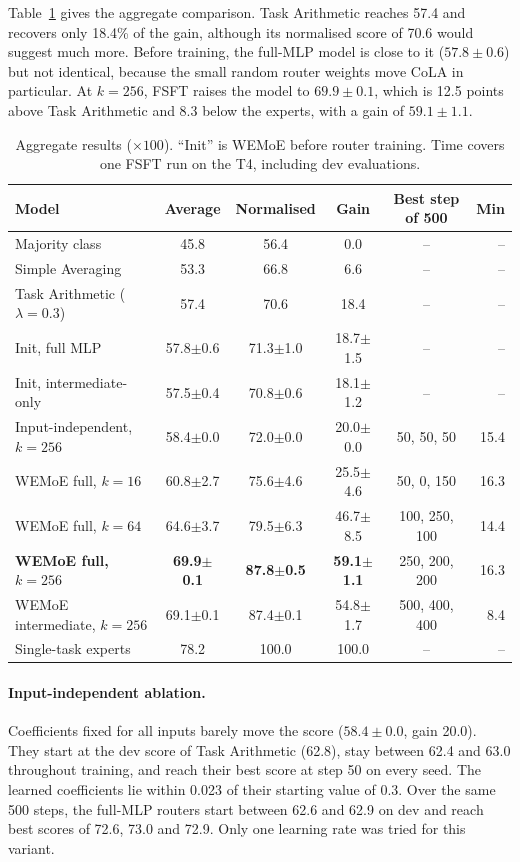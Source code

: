 Table~\ref{tab:main} gives the aggregate comparison. Task Arithmetic reaches 57.4 and recovers only 18.4\% of the gain, although its normalised score of 70.6 would suggest much more. Before training, the full-MLP model is close to it ($57.8\pm0.6$) but not identical, because the small random router weights move CoLA in particular. At $k=256$, FSFT raises the model to $69.9\pm0.1$, which is 12.5 points above Task Arithmetic and 8.3 below the experts, with a gain of $59.1\pm1.1$.

\begin{table}[htbp]
  \centering\tablestyle
  \caption{Aggregate results ($\times100$). ``Init'' is WEMoE before router training. Time covers one FSFT run on the T4, including dev evaluations.}
  \label{tab:main}
  \begin{tabular}{l c c c c r}
    \toprule
    Model & Average & Normalised & Gain & Best step of 500 & Min\\
    \midrule
    Majority class & 45.8 & 56.4 & 0.0 & -- & --\\
    Simple Averaging & 53.3 & 66.8 & 6.6 & -- & --\\
    Task Arithmetic ($\lambda=0.3$) & 57.4 & 70.6 & 18.4 & -- & --\\
    Init, full MLP & 57.8$\pm$0.6 & 71.3$\pm$1.0 & 18.7$\pm$1.5 & -- & --\\
    Init, intermediate-only & 57.5$\pm$0.4 & 70.8$\pm$0.6 & 18.1$\pm$1.2 & -- & --\\
    Input-independent, $k=256$ & 58.4$\pm$0.0 & 72.0$\pm$0.0 & 20.0$\pm$0.0 & 50, 50, 50 & 15.4\\
    WEMoE full, $k=16$ & 60.8$\pm$2.7 & 75.6$\pm$4.6 & 25.5$\pm$4.6 & 50, 0, 150 & 16.3\\
    WEMoE full, $k=64$ & 64.6$\pm$3.7 & 79.5$\pm$6.3 & 46.7$\pm$8.5 & 100, 250, 100 & 14.4\\
    \textbf{WEMoE full, $k=256$} & \textbf{69.9$\pm$0.1} & \textbf{87.8$\pm$0.5} & \textbf{59.1$\pm$1.1} & 250, 200, 200 & 16.3\\
    WEMoE intermediate, $k=256$ & 69.1$\pm$0.1 & 87.4$\pm$0.1 & 54.8$\pm$1.7 & 500, 400, 400 & 8.4\\
    Single-task experts & 78.2 & 100.0 & 100.0 & -- & --\\
    \bottomrule
  \end{tabular}
\end{table}

\paragraph{Input-independent ablation.} Coefficients fixed for all inputs barely move the score ($58.4\pm0.0$, gain 20.0). They start at the dev score of Task Arithmetic (62.8), stay between 62.4 and 63.0 throughout training, and reach their best score at step 50 on every seed. The learned coefficients lie within 0.023 of their starting value of 0.3. Over the same 500 steps, the full-MLP routers start between 62.6 and 62.9 on dev and reach best scores of 72.6, 73.0 and 72.9. Only one learning rate was tried for this variant.

